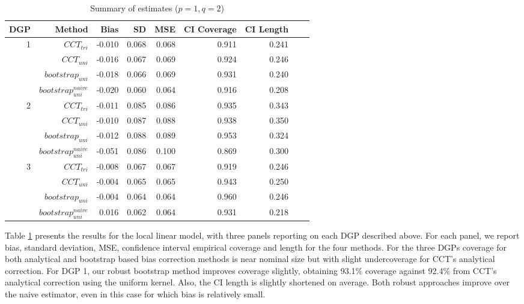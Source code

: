 \documentclass[12pt,fleqn]{article}
\begin{document}
\begin{table}[t]
\centering
\begin{tabular}{rrrrrrrrr}
  \toprule
	DGP & Method    & Bias    & SD    & MSE   & CI Coverage & CI Length \\
  \midrule
	1 & $CCT_{tri}$ & -0.010 & 0.068 & 0.068 & 0.911 & 0.241 \\ 
	  & $CCT_{uni}$ & -0.016 & 0.067 & 0.069 & 0.924 & 0.246 \\ 
	  & $bootstrap_{uni}$ & -0.018 & 0.066 & 0.069 & 0.931 & 0.240 \\ 
	  & $bootstrap_{uni}^{naive}$ & -0.020 & 0.060 & 0.064 & 0.916 & 0.208 \\
	\midrule
	2 & $CCT_{tri}$ & -0.011 & 0.085 & 0.086 & 0.935 & 0.343 \\ 
	  & $CCT_{uni}$ & -0.010 & 0.087 & 0.088 & 0.938 & 0.350 \\ 
	  & $bootstrap_{uni}$       & -0.012 & 0.088 & 0.089 & 0.953 & 0.324 \\ 
	  & $bootstrap_{uni}^{naive}$ & -0.051 & 0.086 & 0.100 & 0.869 & 0.300 \\ 
	\midrule
	3 & $CCT_{tri}$ & -0.008 & 0.067 & 0.067 & 0.919 & 0.246 \\ 
	  & $CCT_{uni}$ & -0.004 & 0.065 & 0.065 & 0.943 & 0.250 \\ 
	  & $bootstrap_{uni}$       & -0.004 & 0.064 & 0.064 & 0.960 & 0.246 \\ 
	  & $bootstrap_{uni}^{naive}$ & 0.016 & 0.062 & 0.064 & 0.931 & 0.218 \\ 
  \bottomrule
\end{tabular}
\caption{Summary of estimates ($p = 1, q = 2$)}
\label{Tb: simulation 1}
\end{table}

Table \ref{Tb: simulation 1} presents the results for the local linear model, with three panels reporting on each DGP described above. For each panel, we report bias, standard deviation, MSE, confidence interval empirical coverage and length for the four methods. For the three DGPs coverage for
    both analytical and bootstrap based bias correction methods is near nominal size but with slight undercoverage for CCT's analytical correction. For DGP 1, our robust bootstrap method improves coverage slightly, obtaining 93.1\% coverage against 92.4\% from CCT's analytical correction using the uniform kernel. Also, the CI length is slightly shortened on average. Both robust approaches improve over the naive estimator, even in this case for which bias is relatively small.
\end{document}
